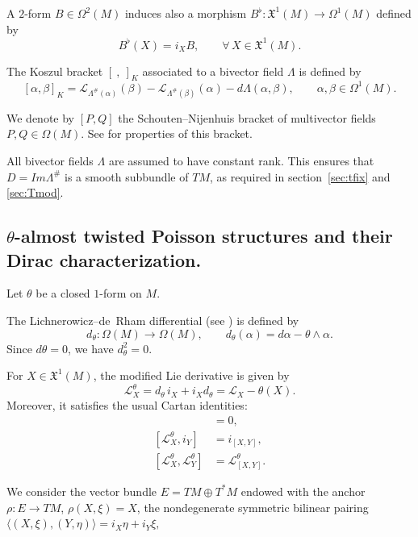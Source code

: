 \documentclass[11pt,a4paper]{article}
\theoremstyle{plain}
\theoremstyle{definition}
\theoremstyle{remark}
\begin{document}
A $2$-form $B\in\Omega^{2}(M)$ induces also a morphism
$B^\flat:\mathfrak{X}^{1}(M)\to \Omega^{1}(M)$ defined by
\[
B^\flat(X)=i_{X}B,\qquad \forall\,X\in \mathfrak{X}^{1}(M).
\]

The Koszul bracket $[\ ,\ ]_{K}$ associated to a bivector field $\Lambda$ is defined by
\[
[\alpha,\beta]_{K}
=\mathcal{L}_{\Lambda^\#(\alpha)}(\beta)
-\mathcal{L}_{\Lambda^\#(\beta)}(\alpha)
-d\Lambda(\alpha,\beta),
\qquad \alpha,\beta\in \Omega^{1}(M).
\]

We denote by $[P,Q]$ the Schouten--Nijenhuis bracket of multivector fields
$P,Q\in\Omega(M)$. See \cite[Theorem 2.8]{CrainicFernandesMarcut2021}
for properties of this bracket.

All bivector fields $\Lambda$ are assumed to have constant rank. This ensures that $D=Im\Lambda^\#$ is a smooth subbundle of $TM$, as required in section~\ref{sec:tfix} and \ref{sec:Tmod}.

\subsection{$\theta$-almost twisted Poisson structures and their Dirac characterization.}
\label{sec:courant_algebroid}
Let $\theta$ be a closed $1$-form on $M$.

The Lichnerowicz--de~Rham differential (see \cite[Definition 2.2]{Chantraine}) is defined by
\begin{equation*}
	d_{\theta}:\Omega(M)\longrightarrow \Omega(M),\qquad
	d_{\theta}(\alpha)=d\alpha-\theta\wedge\alpha .
\end{equation*}
Since $d\theta=0$, we have $d_{\theta}^{2}=0$.

For $X\in \mathfrak{X}^{1}(M)$, the modified Lie derivative is given by
\begin{equation*}
	\mathcal{L}^{\theta}_{X}=d_{\theta}\, i_{X}+ i_{X} d_{\theta}
	=\mathcal{L}_{X}-\theta(X).
\end{equation*}
Moreover, it satisfies the usual Cartan identities:
\begin{align}
	[\mathcal{L}^{\theta}_{X},d_{\theta}] &= 0, \label{cartan1}\\
	[\mathcal{L}^{\theta}_{X}, i_{Y}] &= i_{[X,Y]}, \label{cartan2}\\
	[\mathcal{L}^{\theta}_{X},\mathcal{L}^{\theta}_{Y}] &= \mathcal{L}^{\theta}_{[X,Y]}. \label{cartan3}
\end{align}

 We consider the vector bundle $E = TM \oplus T^*M$ endowed with the anchor
 $\rho: E\to TM$, $\rho(X,\xi)=X$,
 the nondegenerate symmetric bilinear pairing
 $	\langle (X,\xi),(Y,\eta) \rangle = i_X\eta + i_Y\xi,$
\end{document}

